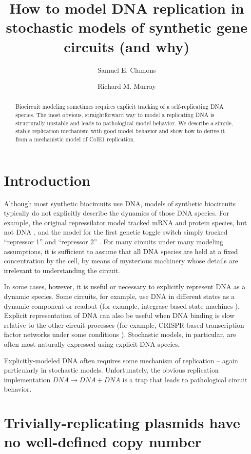 \documentclass[journal = jacsat,manuscript = note]{achemso}
\title{How to model DNA replication in stochastic models of synthetic gene circuits (and why)}
\author{Samuel E. Clamons}
\author{Richard M. Murray}
\affiliation{Caltech, Pasadena, CA, United States}
\begin{document}
\begin{abstract}
Biocircuit modeling sometimes requires explicit tracking of a self-replicating DNA species. The most obvious, straightforward way to model a replicating DNA is structurally unstable and leads to pathological model behavior. We describe a simple, stable replication mechanism with good model behavior and show how to derive it from a mechanistic model of ColE1 replication. 
\end{abstract}

\section{Introduction}

Although most synthetic biocircuits use DNA, models of synthetic biocircuits typically do not explicitly describe the dynamics of those DNA species. For example, the original repressilator model tracked mRNA and protein species, but not DNA \cite{elowitz2000}, and the model for the first genetic toggle switch simply tracked ``repressor 1'' and ``repressor 2'' \cite{gardner2000}. For many circuits under many modeling assumptions, it is sufficient to assume that all DNA species are held at a fixed concentration by the cell, by means of mysterious machinery whose details are irrelevant to understanding the circuit.

In some cases, however, it is useful or necessary to explicitly represent DNA as a dynamic species. Some circuits, for example, use DNA in different states as a dynamic component or readout (for example, integrase-based state machines \cite{roquet2016}). Explicit representation of DNA can also be useful when DNA binding is slow relative to the other circuit processes (for example, CRISPR-based transcription factor networks under some conditions \cite{Jones2017}). Stochastic models, in particular, are often most naturally expressed using explicit DNA species.

Explicitly-modeled DNA often requires some mechanism of replication -- again particularly in stochastic models. Unfortunately, the obvious replication implementation $\mathit{DNA} \to \mathit{DNA} + \mathit{DNA}$ is a trap that leads to pathological circuit behavior. 

\section{Trivially-replicating plasmids have no well-defined copy number}
\end{document}
